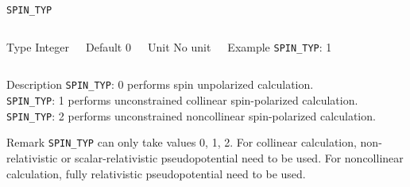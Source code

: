 \begin{frame}[allowframebreaks]{\texttt{SPIN\_TYP}} \label{SPIN_TYP}
\vspace*{-12pt}
\begin{columns}
\begin{block}{Type}
Integer
\end{block}

\begin{block}{Default}
0
\end{block}

\begin{block}{Unit}
No unit
\end{block}

\begin{block}{Example}
\texttt{SPIN\_TYP}: 1
\end{block}
\end{columns}

\begin{block}{Description}
\texttt{SPIN\_TYP}: 0 performs spin unpolarized calculation. \\
\texttt{SPIN\_TYP}: 1 performs unconstrained collinear spin-polarized calculation.  \\
\texttt{SPIN\_TYP}: 2 performs unconstrained noncollinear spin-polarized calculation.   
\end{block}

\begin{block}{Remark}
\texttt{SPIN\_TYP} can only take values 0, 1, 2. For collinear calculation, non-relativistic or scalar-relativistic pseudopotential need to be used. For noncollinear calculation, fully relativistic pseudopotential need to be used. 
\end{block}

\end{frame}



